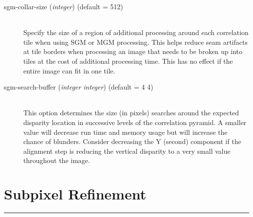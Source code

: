 \begin{description}
\item[sgm-collar-size \textnormal{\small{(\emph{integer})}} (default = 512)]\hfill \\

  Specify the size of a region of additional processing around each correlation tile when
  using SGM or MGM processing.  This helps reduce seam artifacts at tile borders when
  processing an image that needs to be broken up into tiles at the cost of additional
  processing time.  This has no effect if the entire image can fit in one tile.

\item[sgm-search-buffer \textnormal{\small{(\emph{integer integer})}} (default = 4 4)] \hfill \\
  This option determines the size (in pixels) searches around the expected
  disparity location in successive levels of the correlation pyramid.  A smaller
  value will decrease run time and memory usage but will increase the chance of 
  blunders.  Consider decreasing the Y (second) component if the alignment step is
  reducing the vertical disparity to a very small value throughout the image.

\end{description}



\section{Subpixel Refinement}
\hrule
\bigskip

